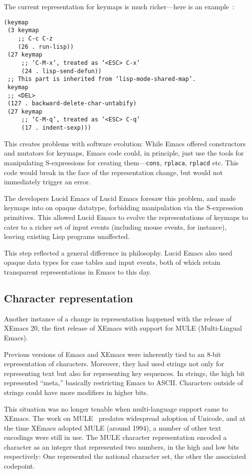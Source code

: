 \documentclass[format=acmsmall, review=false, screen=true]{acmart}
\begin{document}
The current representation for keymaps is much richer---here is an
example~\cite{ELispManual2018}:
%
\begin{verbatim}
(keymap
 (3 keymap
    ;; C-c C-z
    (26 . run-lisp))
 (27 keymap
     ;; ‘C-M-x’, treated as ‘<ESC> C-x’
     (24 . lisp-send-defun))
 ;; This part is inherited from ‘lisp-mode-shared-map’.
 keymap
 ;; <DEL>
 (127 . backward-delete-char-untabify)
 (27 keymap
     ;; ‘C-M-q’, treated as ‘<ESC> C-q’
     (17 . indent-sexp)))
\end{verbatim}
%
This creates problems with software evolution: While Emacs offered
constructors and mutators for keymaps, Emacs code could, in principle,
just use the tools for manipulating S-expressions for creating
them---\texttt{cons}, \texttt{rplaca}, \texttt{rplacd} etc.  This code
would break in the face of the representation change, but would not
immediately trigger an error.

The developers Lucid Emacs of Lucid Emacs foresaw this problem, and
made keymaps into on opaque datatype, forbidding manipulation via the
S-expression primitives.  This allowed Lucid Emacs to evolve the
representations of keymaps to cater to a richer set of input events
(including mouse events, for instance), leaving existing Lisp programs
unaffected.

This step reflected a general difference in philosophy.  Lucid Emacs
also used opaque data types for case tables and input events, both of
which retain transparent representations in Emacs to this day.

\subsection{Character representation}
\label{sec:character-representation}

Another instance of a change in representation happened with the
release of XEmacs 20, the first release of XEmacs with support for
MULE (Multi-Lingual Emacs).

Previous versions of Emacs and XEmacs were inherently tied to an 8-bit
representation of characters.  Moreover, they had used strings not
only for representing text but also for representing key sequences.
In strings, the high bit represented ``meta,'' basically restricting
Emacs to ASCII.  Characters outside of strings could have more
modifiers in higher bits.

This situation was no longer tenable when multi-language support came
to XEmacs.  The work on MULE~\cite{Ohmaki2002} predates widespread
adoption of Unicode, and at the time XEmacs adopted MULE (around
1994), a number of other text encodings were still in use.  The MULE
character representation encoded a character as an integer that
represented two numbers, in the high and low bits respectively: One
represented the national character set, the other the associated
codepoint.
\end{document}
